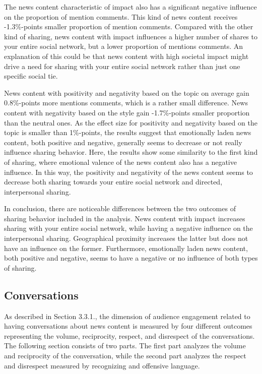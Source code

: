 \documentclass[
]{article}
\begin{document}
The news content characteristic of impact also has a significant
negative influence on the proportion of mention comments. This kind of
news content receives -1.3\%-points smaller proportion of mention
comments. Compared with the other kind of sharing, news content with
impact influences a higher number of shares to your entire social
network, but a lower proportion of mentions comments. An explanation of
this could be that news content with high societal impact might drive a
need for sharing with your entire social network rather than just one
specific social tie.

News content with positivity and negativity based on the topic on
average gain 0.8\%-points more mentions comments, which is a rather
small difference. News content with negativity based on the style gain
-1.7\%-points smaller proportion than the neutral ones. As the effect
size for positivity and negativity based on the topic is smaller than
1\%-points, the results suggest that emotionally laden news content,
both positive and negative, generally seems to decrease or not really
influence sharing behavior. Here, the results show some similarity to
the first kind of sharing, where emotional valence of the news content
also has a negative influence. In this way, the positivity and
negativity of the news content seems to decrease both sharing towards
your entire social network and directed, interpersonal sharing.

\hspace{-2.5em}

\noindent In conclusion, there are noticeable differences between the
two outcomes of sharing behavior included in the analysis. News content
with impact increases sharing with your entire social network, while
having a negative influence on the interpersonal sharing. Geographical
proximity increases the latter but does not have an influence on the
former. Furthermore, emotionally laden news content, both positive and
negative, seems to have a negative or no influence of both types of
sharing.

\hypertarget{conversations}{%
\subsection{Conversations}\label{conversations}}

As described in Section 3.3.1., the dimension of audience engagement
related to having conversations about news content is measured by four
different outcomes representing the volume, reciprocity, respect, and
disrespect of the conversations. The following section consists of two
parts. The first part analyzes the volume and reciprocity of the
conversation, while the second part analyzes the respect and disrespect
measured by recognizing and offensive language.
\end{document}
